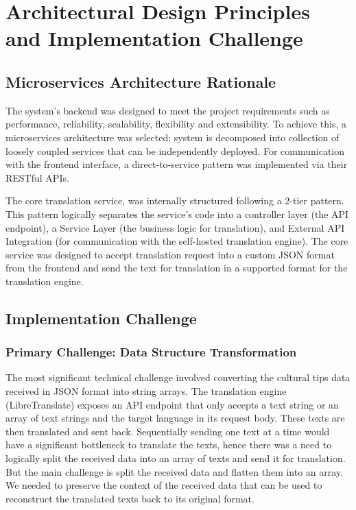 \section{Architectural Design Principles and Implementation Challenge}

\subsection{Microservices Architecture Rationale}

The system's backend was designed to meet the project requirements such as performance, reliability, scalability, flexibility and extensibility. To achieve this, a microservices architecture was selected: system is decomposed into collection of loosely coupled services that can be independently deployed\cite{newman2021building}. For communication with the frontend interface, a direct-to-service pattern was implemented via their RESTful APIs.

The core translation service, was internally structured following a 2-tier pattern\cite{fowler2002patterns}. This pattern logically separates the service's code into a controller layer (the API endpoint), a Service Layer (the business logic for translation), and External API Integration (for communication with the self-hosted translation engine). The core service was designed to accept translation request into a custom JSON format from the frontend and send the text for translation in a supported format for the translation engine.

\subsection{Implementation Challenge}

\subsubsection{Primary Challenge: Data Structure Transformation}

The most significant technical challenge involved converting the cultural tips data received in JSON format into string arrays. The translation engine (LibreTranslate) exposes an API endpoint that only accepts a text string or an array of text strings and the target language in its request body. These texts are then translated and sent back. Sequentially sending one text at a time would have a significant bottleneck to translate the texts, hence there was a need to logically split the received data into an array of texts and send it for translation. But the main challenge is split the received data and flatten them into an array. We needed to preserve the context of the received data that can be used to reconstruct the translated texts back to its original format.

